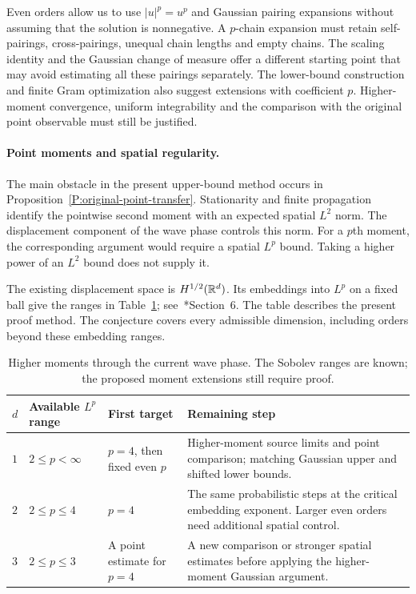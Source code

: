 Even orders allow us to use $|u|^p = u^p$ and Gaussian pairing expansions
without assuming that the solution is nonnegative. A $p$-chain expansion must
retain self-pairings, cross-pairings, unequal chain lengths and empty chains.
The scaling identity and the Gaussian change of measure offer a different
starting point that may avoid estimating all these pairings separately.
The lower-bound construction and finite Gram optimization also suggest
extensions with coefficient $p$. Higher-moment convergence, uniform
integrability and the comparison with the original point observable must
still be justified.

\paragraph{Point moments and spatial regularity.}
The main obstacle in the present upper-bound method occurs in
Proposition~\ref{P:original-point-transfer}. Stationarity and finite
propagation identify the pointwise second moment with an expected spatial
$L^2$ norm. The displacement component of the wave phase controls this norm.
For a $p$th moment, the corresponding argument would require a spatial $L^p$
bound. Taking a higher power of an $L^2$ bound does not supply it.

The existing displacement space is $H^{1/2}(\mathbb{R}^d)$. Its embeddings into
$L^p$ on a fixed ball give the ranges in Table~\ref{Tab:future-moments};
see~\cite{di-nezza.palatucci.ea:12:hitchhikers}*{Section~6}.
The table describes the present proof method. The conjecture covers every
admissible dimension, including orders beyond these embedding ranges.

\begin{table}[htbp]
  \centering
  \caption{Higher moments through the current wave phase. The Sobolev ranges
    are known; the proposed moment extensions still require proof.}
  \label{Tab:future-moments}
  \begin{tabular}{@{}p{}p{}p{}p{}@{}}
    \toprule
    $d$ & Available $L^p$ range & First target & Remaining step \\
    \midrule
    $1$ & $2 \le p < \infty$ & $p = 4$, then fixed even $p$ &
    Higher-moment source limits and point comparison; matching Gaussian upper
    and shifted lower bounds. \\[6pt]
    $2$ & $2 \le p \le 4$ & $p = 4$ &
    The same probabilistic steps at the critical embedding exponent. Larger
    even orders need additional spatial control. \\[6pt]
    $3$ & $2 \le p \le 3$ & A point estimate for $p = 4$ &
    A new comparison or stronger spatial estimates before applying the
    higher-moment Gaussian argument. \\
    \bottomrule
  \end{tabular}
\end{table}

